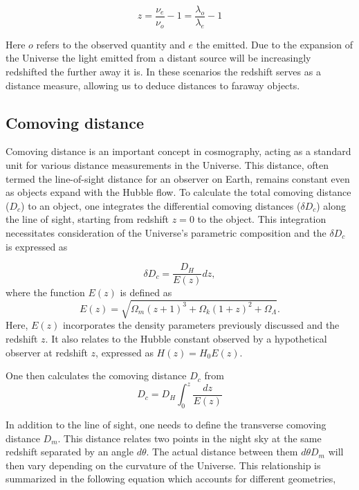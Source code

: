 \begin{equation}
    z = \frac{\nu_e}{\nu_o}-1 = \frac{\lambda_o}{\lambda_e}-1
\end{equation}

Here $o$ refers to the observed quantity and $e$ the emitted. Due to the expansion of the Universe the light emitted from a distant source will be increasingly redshifted the further away it is.
In these scenarios the redshift serves as a distance measure, allowing us to deduce distances to faraway objects.



\subsection{Comoving distance}
\label{sec:comoving_distance}


Comoving distance is an important concept in cosmography, 
acting as a standard unit for various distance measurements in the Universe. 
This distance, often termed the line-of-sight distance for an observer on Earth, 
remains constant even as objects expand with the Hubble flow. 
To calculate the total comoving distance ($D_c$) to an object, 
one integrates the differential comoving distances ($\delta D_c$) along the line of sight, starting from redshift 
$z=0$ to the object. This integration necessitates consideration of the Universe's parametric composition and the $\delta D_c$ is expressed as

\begin{equation}
    \delta D_c = \frac{D_H}{E(z)}dz,
\end{equation}
where the function $E(z)$ is defined as
\begin{equation}
    E(z)  = \sqrt{\Omega_m(z+1)^3 +\Omega_k (1+z)^2 + \Omega_\Lambda  }.
\end{equation}
Here, 
$E(z)$ incorporates the density parameters previously discussed and the redshift 
$z$. It also relates to the Hubble constant observed by a hypothetical observer at redshift $z$, expressed as 
$H(z) = H_0 E(z)$.

One then calculates the comoving distance $D_c$ from 
\begin{equation}
    D_c =D_H \int_0^z\frac{dz}{E(z)}
\end{equation}

In addition to the line of sight, one needs to define the transverse comoving distance $D_m$. This distance 
relates two points in the night sky at the same redshift separated by an angle $d\theta$. The actual distance
between them $d\theta D_m$ will then vary depending on the curvature of the Universe. This relationship is summarized in the following equation
which accounts for different geometries,


